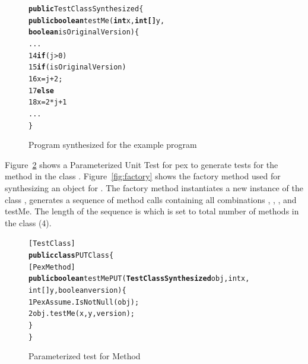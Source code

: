 {\begin{figure}[t]
\begin{CodeOut}
\begin{alltt}
  \textbf{public} TestClassSynthesized\{
  \hspace{0.5cm}\textbf{public boolean} testMe(\textbf{int }x, \textbf{int[] } y, 
  \hspace{3cm}\textbf{boolean} isOriginalVersion)\{
  \hspace{2.0cm} ...
14\hspace{2.0cm} \textbf{if}(j > 0)
15\hspace{2.5cm} \textbf{if}(isOriginalVersion)	 
16\hspace{3.0cm} x = j+2;
17\hspace{2.5cm} \textbf{else}
18\hspace{3.0cm} x = 2*j+1
  \hspace{2.0cm} ...
  \}
\end{alltt}
\end{CodeOut}
\vspace{-0.15 in}
\caption{Program synthesized for the example program}
\label{fig:Changed}
\end{figure}

Figure~\ref{fig:PUT} shows a Parameterized Unit Test for pex to generate tests for the method  in the class . Figure~\ref{fig:factory} shows the factory method used for synthesizing an object for . The factory method instantiates a new instance of the class , generates a sequence of method calls containing all combinations , , , and testMe. The length of the sequence is  which is set to total number of methods in the class  (4). 



\begin{figure}[t]
\begin{CodeOut}
\begin{alltt}
  [TestClass]
  \textbf{public class} PUTClass\{
  \hspace{0.5cm}[PexMethod]
  \hspace{0.5cm}\textbf{public boolean} testMePUT(\textbf{TestClassSynthesized} obj, int x, 
  \hspace{1.5cm}int[] y, boolean version)\{
 1\hspace{1.0cm}PexAssume.IsNotNull(obj);
 2\hspace{1.0cm}obj.testMe(x, y, version);
  \hspace{0.5cm}\}
  \}
\end{alltt}
\end{CodeOut}
\vspace{-0.15 in}
\caption{Parameterized test for Method }
\label{fig:PUT}
\end{figure}

}
